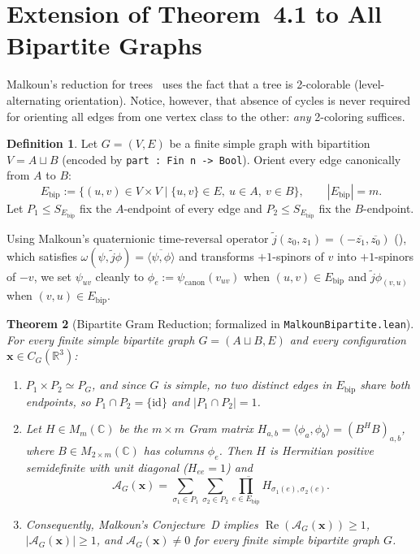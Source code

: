 \documentclass[11pt]{amsart}
\renewcommand{\_}{\origunderscore\penalty0\relax}
\theoremstyle{plain}
\newtheorem{theorem}{Theorem}[section]
\theoremstyle{definition}
\newtheorem{definition}[theorem]{Definition}
\theoremstyle{remark}
\newcommand{\C}{\mathbb{C}}
\newcommand{\R}{\mathbb{R}}
\newcommand{\AG}{\mathcal{A}_G}
\DeclareMathOperator{\RePart}{Re}
\begin{document}
\section{Extension of Theorem~4.1 to All Bipartite Graphs}\label{sec:bipartite}

Malkoun's reduction for trees~\cite[Theorem~4.1]{Malkoun2026} uses the fact that a tree is 2-colorable (level-alternating orientation). Notice, however, that absence of cycles is never required for orienting all edges from one vertex class to the other: \emph{any} 2-coloring suffices.

\begin{definition}
Let $G = (V, E)$ be a finite simple graph with bipartition $V = A \sqcup B$ (encoded by \texttt{part : Fin n -> Bool}). Orient every edge canonically from $A$ to $B$:
\[
    E_{\mathrm{bip}} := \{(u, v) \in V \times V \mid \{u, v\} \in E,\ u \in A,\ v \in B\}, \qquad |E_{\mathrm{bip}}| = m.
\]
Let $P_1 \le S_{E_{\mathrm{bip}}}$ fix the $A$-endpoint of every edge and $P_2 \le S_{E_{\mathrm{bip}}}$ fix the $B$-endpoint.
\end{definition}

Using Malkoun's quaternionic time-reversal operator $\tilde{j}(z_0, z_1) = (-\overline{z_1}, \overline{z_0})$ (\cite[Eq.~(22)]{Malkoun2026}), which satisfies $\omega(\psi, \tilde{j}\phi) = \overline{\langle \psi, \phi \rangle}$ and transforms $+1$-spinors of $v$ into $+1$-spinors of $-v$, we set $\psi_{uv}$ cleanly to $\phi_e := \psi_{\mathrm{canon}}(v_{uv})$ when $(u, v) \in E_{\mathrm{bip}}$ and $\tilde{j}\phi_{(v,u)}$ when $(v, u) \in E_{\mathrm{bip}}$.

\begin{theorem}[Bipartite Gram Reduction; formalized in \texttt{MalkounBipartite.lean}]\label{thm:bipartite}
For every finite simple bipartite graph $G = (A \sqcup B, E)$ and every configuration $\mathbf{x} \in C_G(\R^3)$:
\begin{enumerate}
    \item $P_1 \times P_2 \simeq P_G$, and since $G$ is simple, no two distinct edges in $E_{\mathrm{bip}}$ share both endpoints, so $P_1 \cap P_2 = \{\mathrm{id}\}$ and $|P_1 \cap P_2| = 1$.
    \item Let $H \in M_m(\C)$ be the $m \times m$ Gram matrix $H_{a,b} = \langle \phi_a, \phi_b \rangle = (B^H B)_{a,b}$, where $B \in M_{2 \times m}(\C)$ has columns $\phi_e$. Then $H$ is Hermitian positive semidefinite with unit diagonal ($H_{ee} = 1$) and
    \[
        \AG(\mathbf{x}) = \overline{\sum_{\sigma_1 \in P_1} \sum_{\sigma_2 \in P_2} \prod_{e \in E_{\mathrm{bip}}} H_{\sigma_1(e), \sigma_2(e)}}.
    \]
    \item Consequently, Malkoun's Conjecture~D implies $\RePart(\AG(\mathbf{x})) \ge 1$, $|\AG(\mathbf{x})| \ge 1$, and $\AG(\mathbf{x}) \neq 0$ for every finite simple bipartite graph $G$.
\end{enumerate}
\end{theorem}
\end{document}

